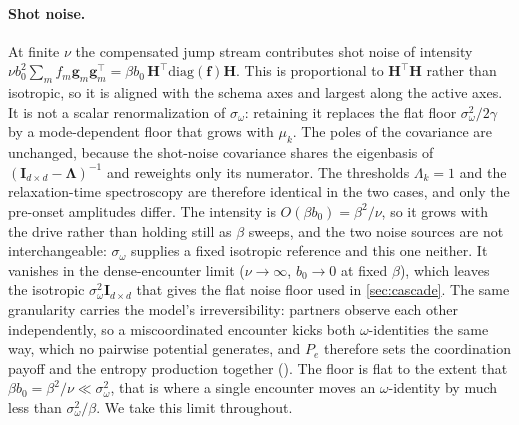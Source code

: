 \documentclass[
  aps,prx,
  reprint,
  superscriptaddress,
  nofootinbib,
  longbibliography
]{revtex4-2}
\newcommand{\g}{\mathbf{g}}
\newcommand{\Lam}{\bm{\Lambda}}
\newcommand{\Id}{\mathbf{I}}
\newcommand{\sidn}{\sigma_{\omega}}
\newcommand{\smref}[1]{\cite[Sec.~#1]{SM}}
\begin{document}
\paragraph{Shot noise.} At finite $\nu$ the compensated jump stream contributes shot noise of intensity $\nu b_0^2\sum_mf_m\g_m\g_m^{\!\top}=\beta b_0\,\bm{H}^{\!\top}\mathrm{diag}(\mathbf{f})\bm{H}$. This is proportional to $\bm{H}^{\!\top}\bm{H}$ rather than isotropic, so it is aligned with the schema axes and largest along the active axes. It is not a scalar renormalization of $\sidn$: retaining it replaces the flat floor $\sidn^2/2\gamma$ by a mode-dependent floor that grows with $\mu_k$. The poles of the covariance are unchanged, because the shot-noise covariance shares the eigenbasis of $(\Id_{d\times d}-\Lam)^{-1}$ and reweights only its numerator. The thresholds $\Lambda_k=1$ and the relaxation-time spectroscopy are therefore identical in the two cases, and only the pre-onset amplitudes differ. The intensity is $O(\beta b_0)=\beta^2/\nu$, so it grows with the drive rather than holding still as $\beta$ sweeps, and the two noise sources are not interchangeable: $\sidn$ supplies a fixed isotropic reference and this one neither. It vanishes in the dense-encounter limit ($\nu\to\infty$, $b_0\to0$ at fixed $\beta$), which leaves the isotropic $\sidn^2\Id_{d\times d}$ that gives the flat noise floor used in \cref{sec:cascade}. The same granularity carries the model's irreversibility: partners observe each other independently, so a miscoordinated encounter kicks both $\omega$-identities the same way, which no pairwise potential generates, and $P_e$ therefore sets the coordination payoff and the entropy production together (\smref{S9}). The floor is flat to the extent that $\beta b_0=\beta^2/\nu\ll\sidn^2$, that is where a single encounter moves an $\omega$-identity by much less than $\sidn^2/\beta$. We take this limit throughout.
\end{document}
